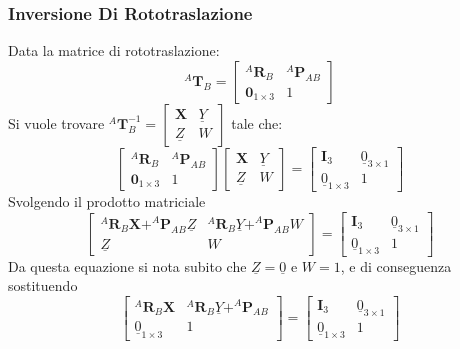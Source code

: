 \documentclass[11pt, a4paper]{report}
\begin{document}
\subsubsection{Inversione Di Rototraslazione}
Data la matrice di rototraslazione:
\[
    ^{A}\mathbf{T}_{B} =
        \begin{bmatrix}
            ^{A}\mathbf{R}_{B} & ^{A}\mathbf{P}_{AB} \\
            \mathbf{0}_{1 \times 3} & 1
        \end{bmatrix}
\]
Si vuole trovare $ ^{A}\mathbf{T}_{B}^{-1} = \begin{bmatrix} \boldsymbol{X} & \underline{Y} \\ \underline{Z} & W \end{bmatrix} $ tale che:
\[
    \begin{bmatrix}
        ^{A}\mathbf{R}_{B} & ^{A}\mathbf{P}_{AB} \\
        \mathbf{0}_{1 \times 3} & 1
    \end{bmatrix}
    \begin{bmatrix}
        \boldsymbol{X} & \underline{Y} \\
        \underline{Z} & W
    \end{bmatrix}
    =
    \begin{bmatrix}
        \mathbf{I}_{3} & \underline{0}_{3 \times 1} \\
        \underline{0}_{1 \times 3} & 1
    \end{bmatrix}
\]
Svolgendo il prodotto matriciale
\[
    \begin{bmatrix}
        ^{A}\mathbf{R}_{B}\boldsymbol{X} + ^{A}\mathbf{P}_{AB}\underline{Z} & ^{A}\mathbf{R}_{B}\underline{Y} + ^{A}\mathbf{P}_{AB}W \\
        \underline{Z} & W
    \end{bmatrix}
    =
    \begin{bmatrix}
        \mathbf{I}_{3} & \underline{0}_{3 \times 1} \\
        \underline{0}_{1 \times 3} & 1
    \end{bmatrix}
\]
Da questa equazione si nota subito che $\underline{Z} = \underline{0}$ e $W = 1$, e di conseguenza sostituendo
\[
    \begin{bmatrix}
        ^{A}\mathbf{R}_{B}\boldsymbol{X} & ^{A}\mathbf{R}_{B}\underline{Y} + ^{A}\mathbf{P}_{AB} \\
        \underline{0}_{1 \times 3} & 1
    \end{bmatrix}
    =
    \begin{bmatrix}
        \mathbf{I}_{3} & \underline{0}_{3 \times 1} \\
        \underline{0}_{1 \times 3} & 1
    \end{bmatrix}
\]
\end{document}

